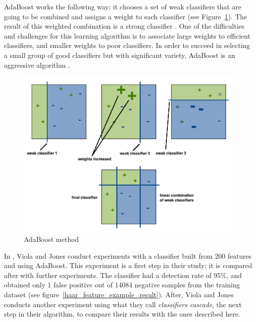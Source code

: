 \noindent AdaBoost works the following way: it chooses a set of weak classifiers that are going to be combined and assigns a weight to each classifier (see Figure~\ref{haar_feature_adaboost}). The result of this weighted combination is a strong classifier \cite{HEW07}. One of the difficulties and challenges for this learning algorithm is to associate large weights to efficient classifiers, and smaller weights to poor classifiers. In order to succeed in selecting a small group of good classifiers but with significant variety, AdaBoost is an aggressive algorithm \cite{VIO01}.
\newline

\begin{figure}[!h]
\begin{center}
\noindent \includegraphics[scale=0.4]{figures/haar_feature_adaboost} 
\newline
\caption{AdaBoost method}
\label{haar_feature_adaboost}
\end{center} 
\end{figure}

\noindent In \cite{VIO01}, Viola and Jones conduct experiments with a classifier built from 200 features and using AdaBoost. This experiment is a first step in their study; it is compared after with further experiments. The classifier had a detection rate of 95\%, and obtained only 1 false positive out of 14084 negative samples from the training dataset (see figure~\ref{haar_feature_example_result}). After, Viola and Jones conducts another experiment using what they call \textit{classifiers cascade}, the next step in their algorithm, to compare their results with the ones described here.
\newline

